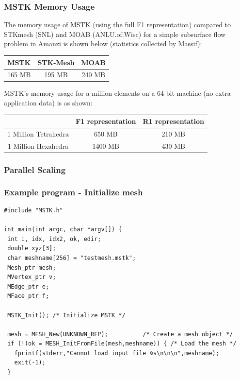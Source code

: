 \documentclass{beamer}
\begin{document}
\begin{frame}
\frametitle{MSTK Memory Usage}

The memory usage of MSTK (using the full F1 representation) compared
to STKmesh (SNL) and MOAB (ANL\/U.of.Wisc) for a simple subsurface flow
problem in Amanzi is shown below (statistics collected by Massif):

\begin{table}
  \begin{center}
  \begin{tabular}{|c|c|c|}
    \hline%
    MSTK & STK-Mesh & MOAB \\
    \hline
    165 MB  & 195 MB  &  240 MB \\
  \hline
  \end{tabular}
  \end{center}
  \label{tab:memtable}
\end{table}

MSTK's memory usage for a million elements on a 64-bit machine (no
extra application data) is as shown:

\begin{table}
  \begin{center}
  \begin{tabular}{|c||c|c|}
    \hline%
     {} & F1 representation & R1 representation \\
    \hline%
    1 Million Tetrahedra  &  650 MB  &  210 MB \\
    1 Million Hexahedra  & 1400 MB  &  430 MB \\
    \hline
  \end{tabular}
  \end{center}
  \label{tab:memtable}
\end{table}

\end{frame}

\begin{frame}
\frametitle{Parallel Scaling}

\end{frame}


\begin{frame}[fragile]
\frametitle{Example program - Initialize mesh}

\begin{verbatim}
#include "MSTK.h"

int main(int argc, char *argv[]) {
 int i, idx, idx2, ok, edir;
 double xyz[3];
 char meshname[256] = "testmesh.mstk";
 Mesh_ptr mesh;
 MVertex_ptr v;
 MEdge_ptr e;
 MFace_ptr f;
  
 MSTK_Init(); /* Initialize MSTK */

 mesh = MESH_New(UNKNOWN_REP);          /* Create a mesh object */
 if (!(ok = MESH_InitFromFile(mesh,meshname)) { /* Load the mesh */
   fprintf(stderr,"Cannot load input file %s\n\n\n",meshname);
   exit(-1);
 }

\end{verbatim}
\end{frame}
\end{document}
